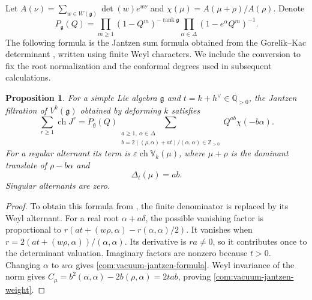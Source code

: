 \documentclass[11pt,a4paper]{amsart}
\numberwithin{equation}{section}
\newtheorem{proposition}[theorem]{Proposition}
\theoremstyle{definition}
\theoremstyle{remark}
\newcommand{\Z}{\mathbb Z}
\newcommand{\Q}{\mathbb Q}
\newcommand{\g}{\mathfrak g}
\newcommand{\ch}{\operatorname{ch}}
\newcommand{\rank}{\operatorname{rank}}
\begin{document}
Let $A(\nu)=\sum_{w\in W(\g)}\det(w)e^{w\nu}$ and
$\chi(\mu)=A(\mu+\rho)/A(\rho)$. Denote
$$
 P_\g(Q)=\prod_{m\ge1}(1-Q^m)^{-\rank\g}
                 \prod_{\alpha\in\Delta}(1-e^\alpha Q^m)^{-1}.
$$
The following formula is the Jantzen sum formula obtained from the
Gorelik--Kac determinant \cite{GK}, written using finite Weyl
characters. We include the conversion to fix the root normalization
and the conformal degrees used in subsequent calculations.

\begin{proposition}\label{com:vacuum-jantzen-root-sum}
For a simple Lie algebra $\g$ and $t=k+h^\vee\in\Q_{>0}$,
the Jantzen filtration of $V^k(\g)$ obtained by deforming $k$ satisfies
\begin{equation}\label{com:vacuum-jantzen-formula}
 \sum_{r\ge1}\ch J^r
 =P_\g(Q)\sum_{\substack{a\ge1,\ \alpha\in\Delta\\
 b=2((\rho,\alpha)+at)/(\alpha,\alpha)\in\Z_{>0}}}
                   Q^{ab}\chi(-b\alpha).
\end{equation}
For a regular alternant its term is
$\varepsilon\ch\mathbb V_k(\mu)$, where
$\mu+\rho$ is the dominant translate of $\rho-b\alpha$ and
\begin{equation}\label{com:vacuum-jantzen-weight}
 \Delta_t(\mu)=ab.
\end{equation}
Singular alternants are zero.
\end{proposition}
\begin{proof}
To obtain this formula from
\cite[Theorem~1.2.8, Example~1.2.12, Sections~2.2.3 and~6.1]{GK}, the
finite denominator is replaced by its Weyl alternant. For a real root
$\alpha+a\delta$, the possible vanishing factor is proportional to
$r(at+(w\rho,\alpha)-r(\alpha,\alpha)/2)$. It vanishes when
$r=2(at+(w\rho,\alpha))/(\alpha,\alpha)$.
Its derivative is $ra\ne0$, so it contributes once to the determinant
valuation. Imaginary factors are nonzero because $t>0$.
Changing $\alpha$ to $w\alpha$ gives
\eqref{com:vacuum-jantzen-formula}. Weyl invariance of the norm gives
$C_\mu=b^2(\alpha,\alpha)-2b(\rho,\alpha)=2tab$,
proving \eqref{com:vacuum-jantzen-weight}.
\end{proof}
\end{document}
